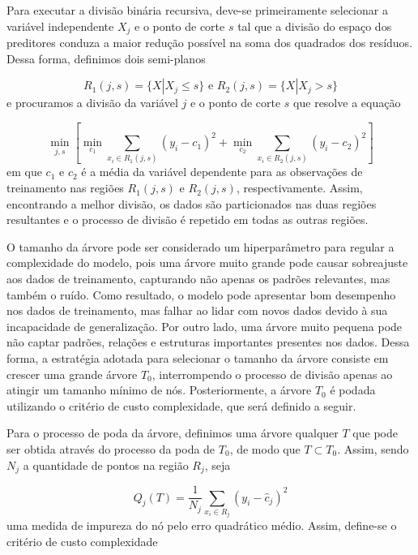 \documentclass[
  12pt,
  a4paper,
]{scrreprt}
\begin{document}
\vspace{12pt}

Para executar a divisão binária recursiva, deve-se primeiramente
selecionar a variável independente \(X_j\) e o ponto de corte \(s\) tal
que a divisão do espaço dos preditores conduza a maior redução possível
na soma dos quadrados dos resíduos. Dessa forma, definimos dois
semi-planos

\[
R_{1}\left(j, s\right) = \{X | X_j \leq s\} \text{ e } R_{2}\left(j, s\right) = \{X | X_j > s\}
\] e procuramos a divisão da variável \(j\) e o ponto de corte \(s\) que
resolve a equação

\[
\min_{j, s}\left[\min_{c_1} \sum_{x_i \in R_1\left(j, s\right)} \left(y_i - c_{1}\right)^2 + \min_{c_2} \sum_{x_i \in R_2\left(j, s\right)} \left(y_i - c_{2}\right)^2\right]
\] em que \(c_1\) e \(c_2\) é a média da variável dependente para as
observações de treinamento nas regiões \(R_1\left(j, s\right)\) e
\(R_2\left(j, s\right)\), respectivamente. Assim, encontrando a melhor
divisão, os dados são particionados nas duas regiões resultantes e o
processo de divisão é repetido em todas as outras regiões.

\vspace{12pt}

O tamanho da árvore pode ser considerado um hiperparâmetro para regular
a complexidade do modelo, pois uma árvore muito grande pode causar
sobreajuste aos dados de treinamento, capturando não apenas os padrões
relevantes, mas também o ruído. Como resultado, o modelo pode apresentar
bom desempenho nos dados de treinamento, mas falhar ao lidar com novos
dados devido à sua incapacidade de generalização. Por outro lado, uma
árvore muito pequena pode não captar padrões, relações e estruturas
importantes presentes nos dados. Dessa forma, a estratégia adotada para
selecionar o tamanho da árvore consiste em crescer uma grande árvore
\(T_0\), interrompendo o processo de divisão apenas ao atingir um
tamanho mínimo de nós. Posteriormente, a árvore \(T_0\) é podada
utilizando o critério de custo complexidade, que será definido a seguir.

\vspace{12pt}

Para o processo de poda da árvore, definimos uma árvore qualquer \(T\)
que pode ser obtida através do processo da poda de \(T_0\), de modo que
\(T \subset T_0\). Assim, sendo \(N_j\) a quantidade de pontos na região
\(R_j\), seja

\[
Q_j\left(T\right) = \frac{1}{N_j} \sum_{x_i \in R_j}\left(y_i - \hat{c}_j\right)^2
\] uma medida de impureza do nó pelo erro quadrático médio. Assim,
define-se o critério de custo complexidade
\end{document}
